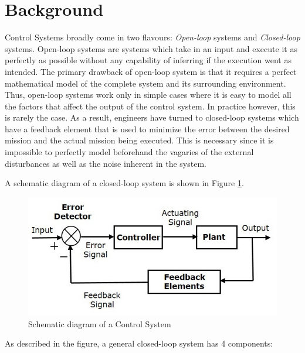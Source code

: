 \section{Background}
Control Systems broadly come in two flavours: \textit{Open-loop} systems and \textit{Closed-loop} systems. Open-loop systems are systems which take in an input and execute it as perfectly as possible without any capability of inferring if the execution went as intended. The primary drawback of open-loop system is that it requires a perfect mathematical model of the complete system and its surrounding environment. Thus, open-loop systems work only in simple cases where it is easy to model all the factors that affect the output of the control system. In practice however, this is rarely the case. As a result, engineers have turned to closed-loop systems which have a feedback element that is used to minimize the error between the desired mission and the actual mission being executed. This is necessary since it is impossible to perfectly model beforehand the vagaries of the external disturbances as well as the noise inherent in the system.

A schematic diagram of a closed-loop system is shown in Figure \ref{fig:control system}.

\begin{figure}
    \includegraphics[scale=0.40]{images/closed_loop.jpg}
    \caption{Schematic diagram of a Control System}
    \label{fig:control system}
\end{figure}


As described in the figure, a general closed-loop system has 4 components:

